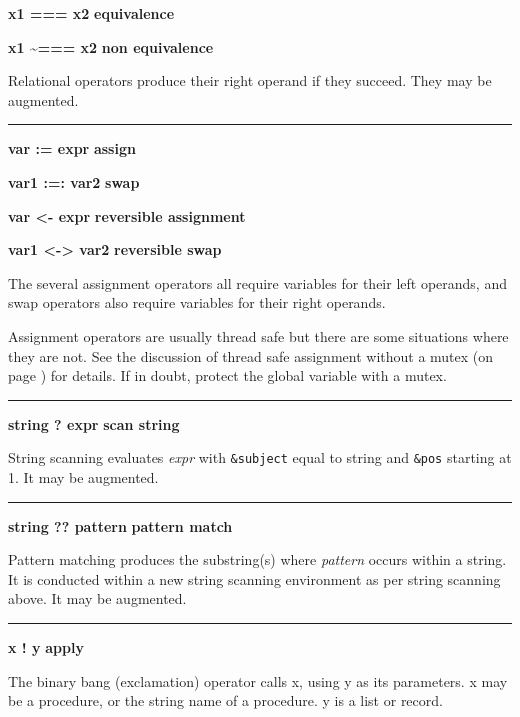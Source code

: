 \noindent
{\bf x1 === x2 } \hfill {\bf equivalence}

\noindent
{\bf x1 \~{}=== x2 } \hfill {\bf non equivalence}

\noindent
Relational operators produce their right operand if they succeed. They
may be augmented.

\bigskip\hrule\vspace{0.1cm}

\noindent
{\bf var := expr } \hfill {\bf assign}

\noindent
{\bf var1 :=: var2 } \hfill {\bf swap}\WarningNotThreadSafe
{}

\noindent
{\bf var {\textless}- expr } \hfill {\bf reversible assignment}

\noindent
{\bf var1 {\textless}-{\textgreater} var2 } \hfill {\bf reversible swap}\WarningNotThreadSafe
{}

\noindent
The several assignment
operators all require variables for their left operands, and swap
operators also require variables for their right operands.

Assignment operators are usually thread safe \ConcurrencyIssue
but there are some situations where they are not. 
See the discussion of thread safe assignment without a mutex (on page
\pageref{ThreadSafeAssignment}) for details. If in doubt, protect the
global variable with a mutex.

\bigskip\hrule\vspace{0.1cm}
\noindent
{\bf string ? expr } \hfill {\bf scan string}

\noindent
{}String scanning evaluates \textit{expr}
with \texttt{\&subject} equal to string and \texttt{\&pos} starting at
1. It may be augmented.

\bigskip\hrule\vspace{0.1cm}
\noindent
{\bf string ?? pattern } \hfill {\bf pattern match}

\noindent
{}Pattern matching produces the substring(s) where
\textit{pattern} occurs within a string. It is conducted within a new
string scanning environment as per string scanning above. It may be augmented.

\bigskip\hrule\vspace{0.1cm}
\noindent
{\bf x ! y } \hfill {\bf apply}

\noindent
{}The binary bang (exclamation) operator calls x,
using y as its parameters.  x may be a procedure, or the string name of
a procedure.  y is a list or record.

